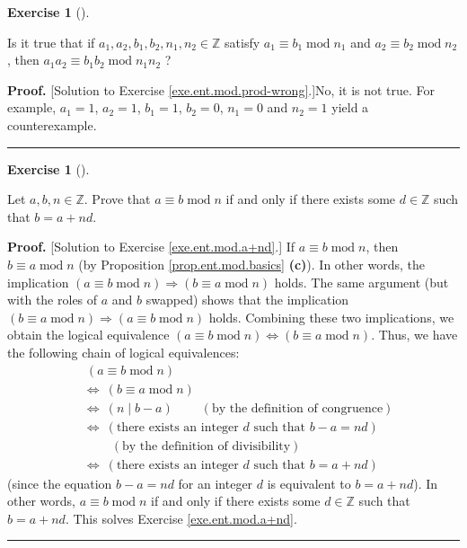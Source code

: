 \documentclass[numbers=enddot,12pt,final,onecolumn,notitlepage]{scrartcl}%
\newcounter{exer}
\numberwithin{exer}{subsection}
\theoremstyle{definition}
\newtheorem{exmp}[exer]{Exercise}
\newenvironment{exercise}[1][]
{\begin{exmp}[#1]\begin{leftbar}}
{\end{leftbar}\end{exmp}}
\newenvironment{fineprint}{\begin{small}}{\end{small}}
\newenvironment{proof}[1][Proof]{\noindent\textbf{#1.} }{\ \rule{0.5em}{0.5em}}
\begin{document}
\begin{exercise}
\label{exe.ent.mod.prod-wrong}Is it true that if $a_{1},a_{2},b_{1}%
,b_{2},n_{1},n_{2}\in\mathbb{Z}$ satisfy $a_{1}\equiv b_{1}\operatorname{mod}%
n_{1}$ and $a_{2}\equiv b_{2}\operatorname{mod}n_{2}$, then $a_{1}a_{2}\equiv
b_{1}b_{2}\operatorname{mod}n_{1}n_{2}$ ?
\end{exercise}

\begin{fineprint}
\begin{proof}
[Solution to Exercise \ref{exe.ent.mod.prod-wrong}.]No, it is not true. For
example, $a_{1}=1$, $a_{2}=1$, $b_{1}=1$, $b_{2}=0$, $n_{1}=0$ and $n_{2}=1$
yield a counterexample.
\end{proof}
\end{fineprint}

\begin{exercise}
\label{exe.ent.mod.a+nd}Let $a,b,n\in\mathbb{Z}$. Prove that $a\equiv
b\operatorname{mod}n$ if and only if there exists some $d\in\mathbb{Z}$ such
that $b=a+nd$.
\end{exercise}

\begin{fineprint}
\begin{proof}
[Solution to Exercise \ref{exe.ent.mod.a+nd}.] If $a\equiv b\operatorname{mod}%
n$, then $b\equiv a\operatorname{mod}n$ (by Proposition
\ref{prop.ent.mod.basics} \textbf{(c)}). In other words, the implication
$\left(  a\equiv b\operatorname{mod}n\right)  \Longrightarrow\left(  b\equiv
a\operatorname{mod}n\right)  $ holds. The same argument (but with the roles of
$a$ and $b$ swapped) shows that the implication $\left(  b\equiv
a\operatorname{mod}n\right)  \Longrightarrow\left(  a\equiv
b\operatorname{mod}n\right)  $ holds. Combining these two implications, we
obtain the logical equivalence $\left(  a\equiv b\operatorname{mod}n\right)
\Longleftrightarrow\left(  b\equiv a\operatorname{mod}n\right)  $. Thus, we
have the following chain of logical equivalences:%
\begin{align*}
& \ \left(  a\equiv b\operatorname{mod}n\right)  \\
& \Longleftrightarrow\ \left(  b\equiv a\operatorname{mod}n\right)  \\
& \Longleftrightarrow\ \left(  n\mid b-a\right)  \ \ \ \ \ \ \ \ \ \ \left(
\text{by the definition of congruence}\right)  \\
& \Longleftrightarrow\ \left(  \text{there exists an integer }d\text{ such
that }b-a=nd\right)  \\
& \ \ \ \ \ \ \ \ \ \ \left(  \text{by the definition of divisibility}\right)
\\
& \Longleftrightarrow\ \left(  \text{there exists an integer }d\text{ such
that }b=a+nd\right)
\end{align*}
(since the equation $b-a=nd$ for an integer $d$ is equivalent to $b=a+nd$). In
other words, $a\equiv b\operatorname{mod}n$ if and only if there exists some
$d\in\mathbb{Z}$ such that $b=a+nd$. This solves Exercise
\ref{exe.ent.mod.a+nd}.
\end{proof}
\end{fineprint}
\end{document}
